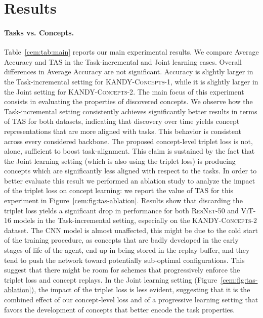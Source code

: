 


\section{Results}


\paragraph{Tasks vs. Concepts.} Table~\ref{cem:tab:main} reports our main experimental results. We compare {\small\sc Average Accuracy} and {\small\sc TAS} in the Task-incremental and Joint learning cases. 
Overall differences in {\small\sc Average Accuracy} are not significant. Accuracy is slightly larger in the Task-incremental setting for \textsc{KANDY-Concepts-1}, while it is slightly larger in the Joint setting for \textsc{KANDY-Concepts-2}. 
%
The main focus of this experiment consists in evaluating the properties of discovered concepts. We observe how the Task-incremental setting consistently achieves significantly better results in terms of {\small\sc TAS} for both datasets, indicating that discovery over time yields concept representations that are more aligned with tasks. This behavior is consistent across every considered backbone.
The proposed concept-level triplet loss is not, alone, sufficient to boost task-alignment. This claim is sustained by the fact that the Joint learning setting (which is also using the triplet loss) is producing concepts which are significantly less aligned with respect to the tasks.
In order to better evaluate this result we performed an ablation study to analyze the impact of the triplet loss on concept learning: we report the value of {\small\sc TAS} for this experiment in Figure~\ref{cem:fig:tas-ablation}. Results show that discarding the triplet loss yields a significant drop in performance for both \textsc{ResNet-50} and \textsc{ViT-16} models in the Task-incremental setting, especially on the \textsc{KANDY-Concepts-2} dataset. The \textsc{CNN} model is almost unaffected, this might be due to the cold start of the training procedure, as concepts that are badly developed in the early stages of life of the agent, end up in being stored in the replay buffer, and they tend to push the network toward potentially sub-optimal configurations. This suggest that there might be room for schemes that progressively enforce the triplet loss and concept replays. In the Joint learning setting (Figure~\ref{cem:fig:tas-ablation}), the impact of the triplet loss is less evident, suggesting that it is the combined effect of our concept-level loss and of a progressive learning setting that favors the development of concepts that better encode the task properties.


